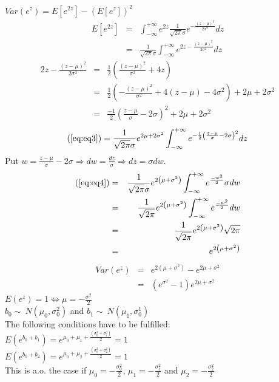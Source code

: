\documentclass[a4paper]{article}
\begin{document}
$Var\left(e^{z}\right) = E\left[e^{2z}\right] - \left(E\left[e^{z}\right]\right)^2$
\begin{eqnarray}
E\left[e^{2z}\right] &=& \int^{+\infty}_{-\infty} e^{2z} \frac{1}{\sqrt{2\pi}\sigma}e^{-\frac{\left(z-\mu\right)^{2}}{2 \sigma^{2}}} dz \nonumber \\
&=& \frac{1}{\sqrt{2\pi}\sigma} \int^{+\infty}_{-\infty} e^{2z - \frac{\left(z-\mu\right)^{2}}{2 \sigma^{2}}} dz \label{eq:eq3}
\end{eqnarray}
\begin{eqnarray}
2z - \frac{\left(z-\mu\right)^{2}}{2 \sigma^{2}} &=& \frac{1}{2}\left(\frac{\left(z-\mu\right)^{2}}{\sigma^{2}} + 4z\right) \nonumber \\
&=& \frac{1}{2}\left(-\frac{\left(z-\mu\right)^{2}}{\sigma^{2}} + 4\left(z-\mu\right) - 4 \sigma^2\right) + 2 \mu + 2 \sigma^2 \nonumber \\
&=& \frac{-1}{2}\left(\frac{z-\mu}{\sigma} - 2 \sigma\right)^{2} + 2 \mu + 2 \sigma^{2} \nonumber
\end{eqnarray}
\begin{eqnarray}
\left(\ref{eq:eq3}\right) = \frac{1}{\sqrt{2\pi}\sigma} e^{2 \mu + 2 \sigma^{2}} \int^{+\infty}_{-\infty} e^{-\frac{1}{2}\left(\frac{z - \mu}{\sigma} - 2 \sigma\right)^2} dz \label{eq:eq4}
\end{eqnarray}
Put $w = \frac{z - \mu}{\sigma} - 2 \sigma \Rightarrow dw = \frac{dz}{\sigma} \Rightarrow dz = \sigma dw$.
\begin{eqnarray}
\left(\ref{eq:eq4}\right) &=& \frac{1}{\sqrt{2\pi}\sigma} e^{2 \left(\mu + \sigma^{2}\right)} \int^{+\infty}_{-\infty} e^{\frac{-w^{2}}{2}} \sigma dw \nonumber \\
&=& \frac{1}{\sqrt{2\pi}} e^{2 \left(\mu + \sigma^{2}\right)} \int^{+\infty}_{-\infty} e^{\frac{-w^{2}}{2}} dw \nonumber \\
&=& \frac{1}{\sqrt{2\pi}} e^{2 \left(\mu + \sigma^{2}\right)} \sqrt{2\pi} \nonumber \\
&=& e^{2 \left(\mu + \sigma^{2}\right)} \nonumber
\end{eqnarray}
\begin{eqnarray}
Var\left(e^{z}\right) &=& e^{2 \left(\mu + \sigma^{2}\right)} - e^{2 \mu + \sigma^{2}} \nonumber \\
&=& \left(e^{\sigma^{2}}-1\right)e^{2 \mu + \sigma^{2}} \nonumber
\end{eqnarray}
$E\left(e^{z}\right)=1 \Leftrightarrow \mu = -\frac{\sigma^{2}}{2}$\\
$b_{0} \sim\ N\left(\mu_{0}, \sigma^{2}_{0}\right)$ and $b_{1} \sim\ N\left(\mu_{1}, \sigma^{1}_{0}\right)$ \\
The following conditions have to be fulfilled:\\
$E\left(e^{b_{0}+b_{1}}\right) = e^{\mu_{0} + \mu_{1} + \frac{\left(\sigma^{2}_{0}+\sigma^{2}_{1}\right)}{2}}=1$\\
$E\left(e^{b_{0}+b_{2}}\right) = e^{\mu_{0} + \mu_{2} + \frac{\left(\sigma^{2}_{0}+\sigma^{2}_{2}\right)}{2}}=1$\\
This is a.o. the case if $\mu_{0} = -\frac{\sigma_{0}^2}{2}$, $\mu_{1} = -\frac{\sigma_{1}^2}{2}$ and $\mu_{2} = -\frac{\sigma_{2}^2}{2}$
\end{document}
